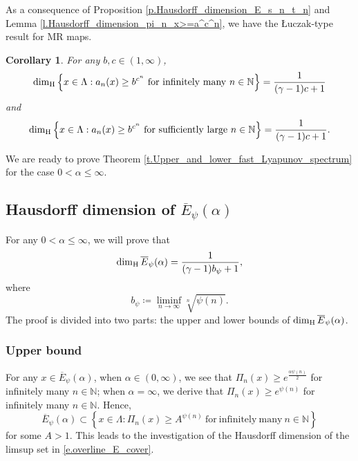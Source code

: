 \documentclass[12pt,reqno]{amsart}
\renewcommand{\=}{\coloneqq}
\theoremstyle{plain}
\newtheorem{cor}[theorem]{Corollary}
\begin{document}
As a consequence of Proposition \ref{p.Hausdorff_dimension_E_s_n_t_n} and Lemma \ref{l.Hausdorff_dimension_pi_n_x>=a^c^n}, we have the {\L}uczak-type result for MR maps.

\begin{cor}
For any $b,c \in (1,\infty)$,
$$
\dim_{\rm H}\left\{x\in \Lambda:a_{n}(x)\geq b^{c^n}\
\mathrm{for\ infinitely\ many}\ n\in \mathbb N\right\}=\frac{1}{(\gamma-1)c+1}
$$
and
$$
\dim_{\rm H}\left\{x\in \Lambda:a_{n}(x)\geq b^{c^n}\
\mathrm{for\ sufficiently\ large}\ n\in \mathbb N\right\}=\frac{1}{(\gamma-1)c+1}.
$$
\end{cor}


We are ready to prove Theorem \ref{t.Upper_and_lower_fast_Lyapunov_spectrum} for the case  $0<\alpha \leq \infty$.



\subsection{Hausdorff dimension of $\overline{E}_{\psi}(\alpha)$}
For any $0<\alpha \leq \infty$, we will prove that
\begin{equation*}
\dim_{\rm H}\overline{E}_{\psi}(\alpha)=\frac{1}{(\gamma-1)b_\psi+1},
\end{equation*}
where
\begin{equation} \label{bproof}
   b_\psi\coloneqq \liminf_{n\to \infty}\sqrt[n]{\psi(n)}.
\end{equation}
The proof is divided into two parts: the upper and lower bounds of $\dim_{\rm H}\overline{E}_{\psi}(\alpha)$.


\subsubsection{Upper bound}
For any $x\in \overline{E}_{\psi}(\alpha)$, when $\alpha\in (0,\infty)$, we see that $\Pi_n(x)\geq e^{\frac{\alpha \psi(n)}{2}}$ for infinitely many $n\in \mathbb N$; when $\alpha=\infty$, we derive that $\Pi_n(x)\geq e^{\psi(n)}$ for infinitely many $n\in \mathbb N$. Hence,
 \begin{equation}\label{e.overline_E_cover}
        \overline{E}_{\psi}(\alpha)\subset
       \left\{x\in \Lambda:
        \Pi_{n}(x)\geq A^{\psi(n)}\
        \mathrm{for\ infinitely\ many}\ n\in \mathbb N\right\}
    \end{equation}
     for some $A>1$. This leads to the investigation of the Hausdorff dimension of the limsup set in \eqref{e.overline_E_cover}.
\end{document}
